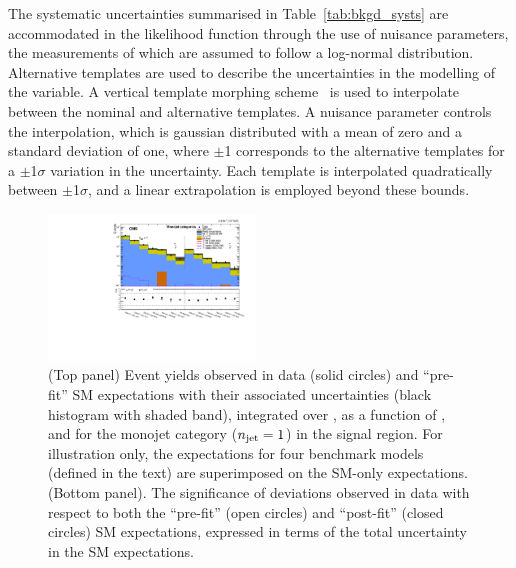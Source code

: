 The systematic uncertainties summarised in Table~\ref{tab:bkgd_systs}
are accommodated in the likelihood function through the use of
nuisance parameters, the measurements of which are assumed to follow a
log-normal distribution. Alternative templates are used to describe
the uncertainties in the modelling of the \HTmiss variable. A vertical
template morphing scheme~\cite{Prosper:1306523} is used to interpolate
between the nominal and alternative \HTmiss templates. A nuisance
parameter controls the interpolation, which is gaussian distributed
with a mean of zero and a standard deviation of one, where $\pm$1
corresponds to the alternative templates for a $\pm$1$\sigma$
variation in the uncertainty. Each template is interpolated
quadratically between $\pm$1$\sigma$, and a linear extrapolation is
employed beyond these bounds.

\begin{figure}[!t]
  \begin{center}
    \includegraphics[width=0.49\textwidth]{figures/result/summaryPlot_Monojet_prefit_overlay_fit_b}
    \caption{(Top panel) Event yields observed in data (solid circles)
      and ``pre-fit'' SM expectations with their associated
      uncertainties (black histogram with shaded band), integrated
      over \HTmiss, as a function
      of \nb, and \scalht for the monojet category ($n_{\text{jet}} = 1$) in
      the signal region. For illustration only, the expectations for
      four benchmark models (defined in the text) are superimposed on
      the SM-only expectations. (Bottom panel). The significance of
      deviations observed in data with respect to both the ``pre-fit''
      (open circles) and ``post-fit'' (closed circles) SM
      expectations, expressed in terms of the total uncertainty in the
      SM expectations.
    }
    \label{fig:mono}
  \end{center}
\end{figure}

